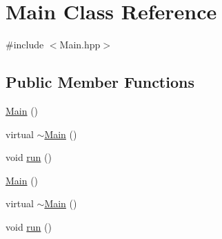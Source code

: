 \hypertarget{classMain}{\section{Main Class Reference}
\label{classMain}
}


{\ttfamily \#include $<$Main.\-hpp$>$}

\subsection*{Public Member Functions}
\begin{DoxyCompactItemize}
\item 
\hyperlink{classMain_a50d4361a1b613205467a441b5c40c199}{Main} ()
\item 
virtual \hyperlink{classMain_a58d9c0798f0d2114e736d04d780a080f}{$\sim$\-Main} ()
\item 
void \hyperlink{classMain_a0cc8dc4e33a596c1e63d186bf9844f8d}{run} ()
\item 
\hyperlink{classMain_a50d4361a1b613205467a441b5c40c199}{Main} ()
\item 
virtual \hyperlink{classMain_a6509d28ba0e266073dfec1b56fe6563d}{$\sim$\-Main} ()
\item 
void \hyperlink{classMain_a0cc8dc4e33a596c1e63d186bf9844f8d}{run} ()
\end{DoxyCompactItemize}


